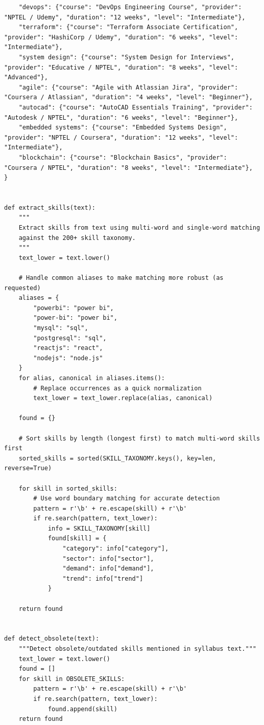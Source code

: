 \documentclass[12pt,a4paper]{report}
\begin{document}
\begin{verbatim}
    "devops": {"course": "DevOps Engineering Course", "provider": "NPTEL / Udemy", "duration": "12 weeks", "level": "Intermediate"},
    "terraform": {"course": "Terraform Associate Certification", "provider": "HashiCorp / Udemy", "duration": "6 weeks", "level": "Intermediate"},
    "system design": {"course": "System Design for Interviews", "provider": "Educative / NPTEL", "duration": "8 weeks", "level": "Advanced"},
    "agile": {"course": "Agile with Atlassian Jira", "provider": "Coursera / Atlassian", "duration": "4 weeks", "level": "Beginner"},
    "autocad": {"course": "AutoCAD Essentials Training", "provider": "Autodesk / NPTEL", "duration": "6 weeks", "level": "Beginner"},
    "embedded systems": {"course": "Embedded Systems Design", "provider": "NPTEL / Coursera", "duration": "12 weeks", "level": "Intermediate"},
    "blockchain": {"course": "Blockchain Basics", "provider": "Coursera / NPTEL", "duration": "8 weeks", "level": "Intermediate"},
}


def extract_skills(text):
    """
    Extract skills from text using multi-word and single-word matching
    against the 200+ skill taxonomy.
    """
    text_lower = text.lower()
    
    # Handle common aliases to make matching more robust (as requested)
    aliases = {
        "powerbi": "power bi",
        "power-bi": "power bi",
        "mysql": "sql",
        "postgresql": "sql",
        "reactjs": "react",
        "nodejs": "node.js"
    }
    for alias, canonical in aliases.items():
        # Replace occurrences as a quick normalization
        text_lower = text_lower.replace(alias, canonical)

    found = {}

    # Sort skills by length (longest first) to match multi-word skills first
    sorted_skills = sorted(SKILL_TAXONOMY.keys(), key=len, reverse=True)

    for skill in sorted_skills:
        # Use word boundary matching for accurate detection
        pattern = r'\b' + re.escape(skill) + r'\b'
        if re.search(pattern, text_lower):
            info = SKILL_TAXONOMY[skill]
            found[skill] = {
                "category": info["category"],
                "sector": info["sector"],
                "demand": info["demand"],
                "trend": info["trend"]
            }

    return found


def detect_obsolete(text):
    """Detect obsolete/outdated skills mentioned in syllabus text."""
    text_lower = text.lower()
    found = []
    for skill in OBSOLETE_SKILLS:
        pattern = r'\b' + re.escape(skill) + r'\b'
        if re.search(pattern, text_lower):
            found.append(skill)
    return found



\end{verbatim}
\end{document}
